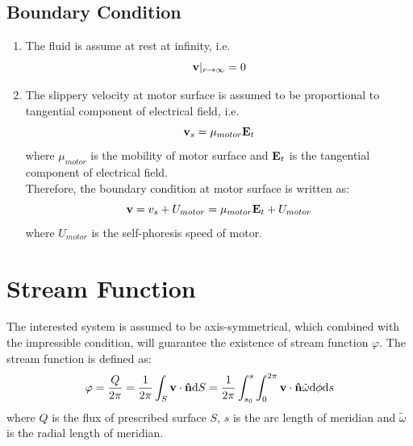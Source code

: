 \documentclass[fontsize=11pt, %
                             paper=a4, %
                             twoside, %
                             captions=tableheading,
                             index=totoc,
                             hyperref]{labbook}
\begin{document}
\subsection{Boundary Condition}
\begin{enumerate}
\item
The fluid is assume at rest at infinity, i.e.
\begin{equation}
\mathbf{v}|_{r\rightarrow\infty}=0
\end{equation}
\item
The slippery velocity at motor surface is assumed to be proportional to tangential component of electrical field, i.e.
\begin{equation}
\mathbf{v}_s=\mu_{motor}\mathbf{E}_t
\end{equation}
where $\mu_{motor}$ is the mobility of motor surface and $\mathbf{E}_t$ is the tangential component of electrical field.\\
Therefore, the boundary condition at motor surface is written as:
\begin{equation}
\mathbf{v}=v_s+U_{motor}=\mu_{motor}\mathbf{E}_t+U_{motor}
\end{equation}
where $U_{motor}$ is the self-phoresis speed of motor.
\end{enumerate}
\section{Stream Function}
The interested system is assumed to be axis-symmetrical, which combined with the impressible condition, will guarantee the existence of stream function $\varphi$. The stream function is defined as:
\begin{equation}
\varphi=\frac{Q}{2\pi}=\frac{1}{2\pi}\int_{S}\mathbf{v}\cdot\mathbf{\hat{n}}\mathrm{d}S=\frac{1}{2\pi}\int_{s_0}^s\int_{0}^{2\pi}\mathbf{v}\cdot \mathbf{\hat{n}} \tilde{\omega}\mathrm{d}\phi\mathrm{d}s
\end{equation}
where $Q$ is the flux of prescribed surface $S$, $s$ is the arc length of meridian and $\tilde{\omega}$ is the radial length of meridian.
\end{document}
